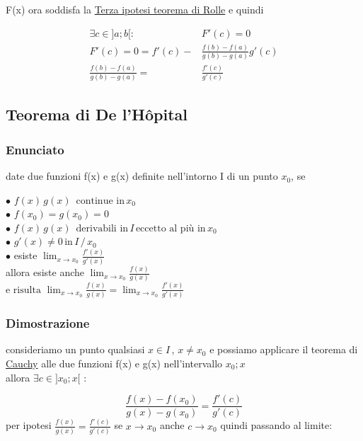 \documentclass[a4paper,11pt]{article}
\begin{document}
F(x) ora soddisfa la \hyperref[sec:3Rolle]{Terza ipotesi teorema di Rolle} e quindi 

\begin{align*}    
\exists c \in ]a;b[ :& F'(c) = 0
\\
F'(c) = 0 = f'(c) -& \frac{f(b) - f(a)}{g(b) - g(a)} g'(c) 
\\
\frac{f(b) - f(a)}{g(b) - g(a)} =& \frac{f'(c)}{g'(c)}
\end{align*}



\subsection{Teorema di De l'Hôpital}

\subsubsection{Enunciato}

date due funzioni f(x) e g(x) definite nell'intorno I di un punto \( x_0 \), se 

$\bullet$
$  f(x) \, g(x) \, \, \, \text{continue in} \, x_0  $
\\
$\bullet$
$  f(x_0) = g(x_0) = 0  $
\\
$\bullet$
$  f(x) \, g(x) \, \, \, \text{derivabili in} \, I \, \text{eccetto al più in} \, x_0 $
\\
$\bullet$
$g'(x) \neq 0 \, \text{in} \,I \, / \, {x_0}$
\\
$\bullet$
esiste $\lim_{x \to x_0} \frac{f'(x)}{g'(x)}$
\\
allora esiste anche $\lim_{x \to x_0} \frac{f(x)}{g(x)}$
\\
$\text{e risulta  } \lim_{x \to x_0} \frac{f(x)}{g(x)} = \lim_{x \to x_0} \frac{f'(x)}{g'(x)} $

\subsubsection{Dimostrazione}

consideriamo un punto qualsiasi \( x \in I \, , \, x \neq x_0 \) e possiamo applicare il teorema di \hyperref[sec:Cauchy]{Cauchy} alle due funzioni f(x) e g(x) nell'intervallo \(  x_0 ; x \) 
\\
allora \( \exists c \in ]x_0 ; x[ \) : 

\[
\frac{f(x) - f(x_0)}{g(x)-g(x_0)} = \frac{f'(c)}{g'(c)}    
\]
per ipotesi \( \frac{f(x)}{g(x)} = \frac{f'(c)}{g'(c)}\)
se \( x \to x_0 \) anche \( c \to x_0\) quindi passando al limite:
\end{document}
